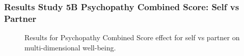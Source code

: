 \documentclass[
  singlecolumn]{article}
\begin{document}
\subsubsection{Results Study 5B Psychopathy Combined Score: Self vs
Partner}\label{results-study-5b-psychopathy-combined-score-self-vs-partner}

\begin{figure}


\caption{\label{fig-results-psychopathy-self}Results for Psychopathy
Combined Score effect for self vs partner on multi-dimensional
well-being.}

\end{figure}%

\newpage{}
\end{document}

